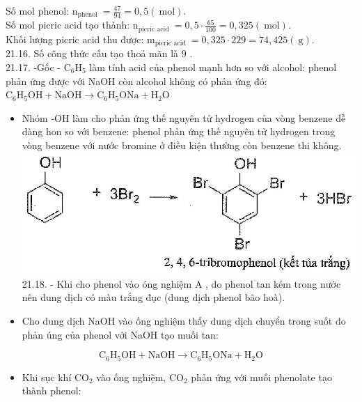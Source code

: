 \documentclass[10pt]{article}
\begin{document}
Số mol phenol: $\mathrm{n}_{\text {phenol }}=\frac{47}{94}=0,5(\mathrm{~mol})$.\\
Số mol picric acid tạo thành: $\mathrm{n}_{\text {picric acid }}=0,5 \cdot \frac{65}{100}=0,325(\mathrm{~mol})$.\\
Khối lượng picric acid thu được: $\mathrm{m}_{\text {picric acid }}=0,325 \cdot 229=74,425(\mathrm{~g})$.\\
21.16. Số công thức cấu tạo thoả mãn là 9 .\\
21.17. -Gốc - $\mathrm{C}_{6} \mathrm{H}_{5}$ làm tính acid của phenol mạnh hơn so với alcohol: phenol phản ứng được với NaOH còn alcohol không có phản ứng đó:\\
$\mathrm{C}_{6} \mathrm{H}_{5} \mathrm{OH}+\mathrm{NaOH} \rightarrow \mathrm{C}_{6} \mathrm{H}_{5} \mathrm{ONa}+\mathrm{H}_{2} \mathrm{O}$

\begin{itemize}
  \item Nhóm -OH làm cho phản ứng thế nguyên tử hydrogen của vòng benzene dễ dàng hon so với benzene: phenol phản ứng thế nguyên tử hydrogen trong vòng benzene với nước bromine ở điều kiện thường còn benzene thi không.\\
\includegraphics[max width=\textwidth, center]{2025_10_23_ed7118e3280f74e91193g-35(3)}\\
21.18. - Khi cho phenol vào óng nghiệm A , do phenol tan kém trong nước nên dung dịch có màu trắng đục (dung dịch phenol bão hoà).
  \item Cho dung dịch NaOH vào ống nghiệm thấy dung dịch chuyển trong suốt do phản úng của phenol với NaOH tạo muối tan:
\end{itemize}

$$
\mathrm{C}_{6} \mathrm{H}_{5} \mathrm{OH}+\mathrm{NaOH} \rightarrow \mathrm{C}_{6} \mathrm{H}_{5} \mathrm{ONa}+\mathrm{H}_{2} \mathrm{O}
$$

\begin{itemize}
  \item Khi sục khí $\mathrm{CO}_{2}$ vào ống nghiệm, $\mathrm{CO}_{2}$ phản ứng với muối phenolate tạo thành phenol:
\end{itemize}
\end{document}

